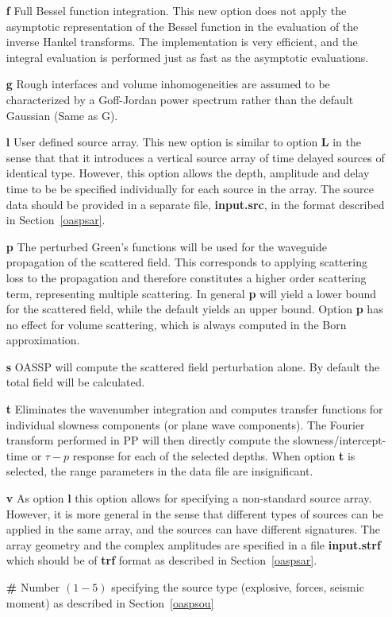 \begin{itemize}
    \item[{\bf f}] Full Bessel function integration. This new option
          does not apply the asymptotic representation of the Bessel
          function in the evaluation of the inverse Hankel transforms.
          The implementation is very efficient, and the integral
          evaluation is performed just as fast as the asymptotic
          evaluations. 
          
\item[{\bf g}] Rough interfaces and volume inhomogeneities
          are assumed to be characterized by a Goff-Jordan power
          spectrum rather than the default Gaussian (Same as G).
          
\item[{\bf l}] User defined source array. This new option is
          similar to option {\bf L} in the sense that that it
          introduces a vertical source array of time delayed sources
          of identical type. However, this option allows the depth,
          amplitude and delay time to be be specified individually for
          each source in the array. The source data should be provided
          in a separate file, {\bf input.src}, in the format described
          in Section~\ref{oaspsar}.  
\item[{\bf p}] The perturbed Green's functions will be used for the
          waveguide propagation of the scattered field. This
          corresponds to applying scattering loss to the propagation
          and therefore constitutes a higher order scattering term,
          representing multiple scattering. In general {\bf p} will yield
          a lower bound for the scattered field, while the default
          yields an upper bound. Option {\bf p} has no effect for
          volume scattering, which is always computed in the Born
          approximation. 
\item[{\bf s}]
          OASSP will compute the scattered field perturbation
          alone. By default the total field will be calculated.
\item[{\bf t}] Eliminates the wavenumber integration and
          computes transfer functions for individual slowness
          components (or plane wave components). The Fourier transform
          performed in PP will then directly compute the
          slowness/intercept-time or $\tau - p$ response for each of
          the selected depths. When option {\bf t} is selected, the
          range parameters in the data file are insignificant.
\item[{\bf v}] As option {\bf l} this option allows for
          specifying a non-standard source array. However, it is more
          general in the sense that different types of sources can be
          applied in the same array, and the sources can have
          different signatures. The array geometry and the complex
          amplitudes are specified in a file {\bf input.strf} which
          should be of {\bf trf} format as described in
          Section~\ref{oaspsar}.  \item[{\bf \#}] Number $(1-5)$
          specifying the source type (explosive, forces, seismic
          moment) as described in Section~\ref{oaspsou}
\end{itemize}


